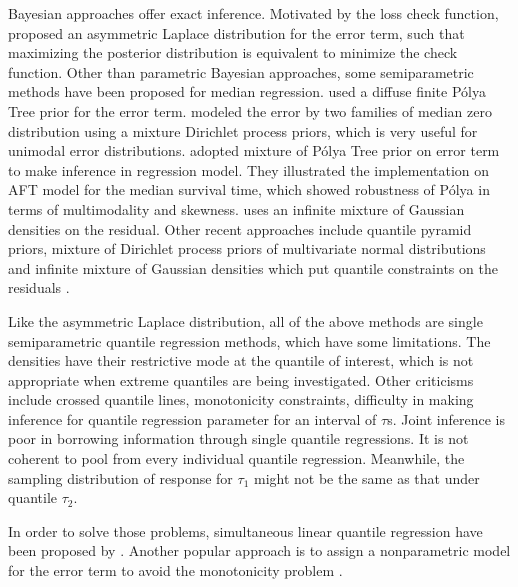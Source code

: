 \documentclass[12pt]{article}
\newcommand{\polya}{P\'{o}lya}
\begin{document}
Bayesian approaches offer exact inference. Motivated by the loss check
function, \citet{yu2001} proposed an asymmetric Laplace distribution
for the error term, such that maximizing the posterior distribution is
equivalent to minimize the check function. Other than parametric
Bayesian approaches, some semiparametric methods have been proposed
for median regression. \citet{walker1999} used a diffuse finite
\polya{} Tree prior for the error term. \citet{kottas2001} modeled the
error by two families of median zero distribution using a mixture
Dirichlet process priors, which is very useful for unimodal error
distributions. \citet{hanson2002} adopted mixture of \polya{} Tree
prior on error term to make inference in regression model. They
illustrated the implementation on AFT model for the median survival
time, which showed robustness of \polya{} in terms of multimodality
and skewness.  \citet{reich2010} uses an infinite mixture of Gaussian
densities on the residual.  Other recent approaches include quantile
pyramid priors, mixture of Dirichlet process priors of multivariate
normal distributions and infinite mixture of Gaussian densities which
put quantile constraints on the residuals \citep{hjort2007,hjort2009,
  kottas2009}.

Like the asymmetric Laplace distribution, all of the above methods are
single semiparametric quantile regression methods, which have some
limitations. The densities have their restrictive mode at the quantile
of interest, which is not appropriate when extreme quantiles are being
investigated. Other criticisms include crossed quantile lines,
monotonicity constraints, difficulty in making inference for quantile
regression parameter for an interval of $\tau$s. Joint inference is
poor in borrowing information through single quantile regressions. It
is not coherent to pool from every individual quantile
regression. Meanwhile, the sampling distribution of response for
$\tau_1$ might not be the same as that under quantile $\tau_2$.

In order to solve those problems, simultaneous linear quantile
regression have been proposed by \citet{tokdar2011}.  Another popular
approach is to assign a nonparametric model for the error term to
avoid the monotonicity problem \citep{scaccia2003, geweke2007,
  taddy2010}.
\end{document}
